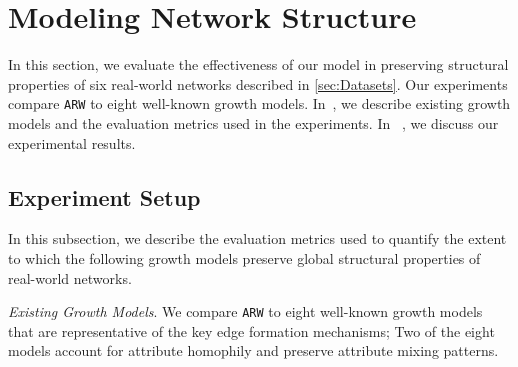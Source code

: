 \section{Modeling Network Structure}
\label{sec:Experiments}
In this section, we evaluate the effectiveness of our model in preserving
structural properties of six real-world networks described in \cref{sec:Datasets}.
Our experiments compare \texttt{ARW} to eight well-known growth models.
In~, we describe existing growth models and the evaluation metrics
used in the experiments. In~ , we discuss our
experimental results.

\subsection{Experiment Setup}
\label{sub:Experimental Setup}

In this subsection, we describe the evaluation metrics used to quantify the extent to
which the following growth models preserve global structural properties of real-world networks.

\textit{Existing Growth Models}. We compare \texttt{ARW} to eight well-known
growth models that are representative of the key edge formation
mechanisms; Two of the eight models account for attribute homophily
and preserve attribute mixing patterns.

